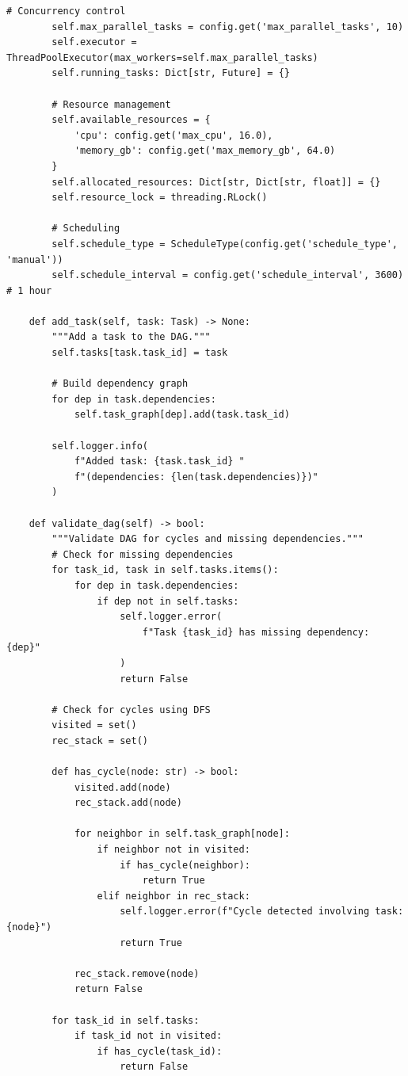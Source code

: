 \begin{lstlisting}[style=python, caption=PipelineOrchestrator with Dependency Management]
        # Concurrency control
        self.max_parallel_tasks = config.get('max_parallel_tasks', 10)
        self.executor = ThreadPoolExecutor(max_workers=self.max_parallel_tasks)
        self.running_tasks: Dict[str, Future] = {}

        # Resource management
        self.available_resources = {
            'cpu': config.get('max_cpu', 16.0),
            'memory_gb': config.get('max_memory_gb', 64.0)
        }
        self.allocated_resources: Dict[str, Dict[str, float]] = {}
        self.resource_lock = threading.RLock()

        # Scheduling
        self.schedule_type = ScheduleType(config.get('schedule_type', 'manual'))
        self.schedule_interval = config.get('schedule_interval', 3600)  # 1 hour

    def add_task(self, task: Task) -> None:
        """Add a task to the DAG."""
        self.tasks[task.task_id] = task

        # Build dependency graph
        for dep in task.dependencies:
            self.task_graph[dep].add(task.task_id)

        self.logger.info(
            f"Added task: {task.task_id} "
            f"(dependencies: {len(task.dependencies)})"
        )

    def validate_dag(self) -> bool:
        """Validate DAG for cycles and missing dependencies."""
        # Check for missing dependencies
        for task_id, task in self.tasks.items():
            for dep in task.dependencies:
                if dep not in self.tasks:
                    self.logger.error(
                        f"Task {task_id} has missing dependency: {dep}"
                    )
                    return False

        # Check for cycles using DFS
        visited = set()
        rec_stack = set()

        def has_cycle(node: str) -> bool:
            visited.add(node)
            rec_stack.add(node)

            for neighbor in self.task_graph[node]:
                if neighbor not in visited:
                    if has_cycle(neighbor):
                        return True
                elif neighbor in rec_stack:
                    self.logger.error(f"Cycle detected involving task: {node}")
                    return True

            rec_stack.remove(node)
            return False

        for task_id in self.tasks:
            if task_id not in visited:
                if has_cycle(task_id):
                    return False


\end{lstlisting}

